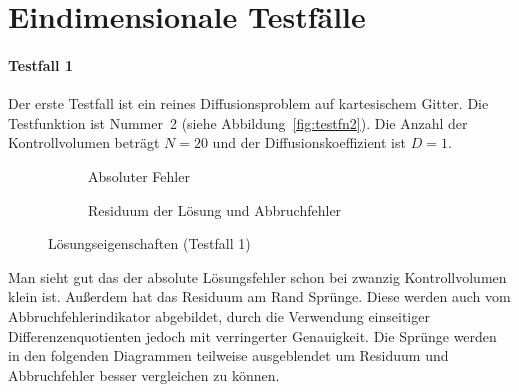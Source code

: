 \section{Eindimensionale Testfälle}

\paragraph{Testfall 1}
\noindent
Der erste Testfall ist ein reines Diffusionsproblem auf kartesischem
Gitter. Die Testfunktion ist Nummer~2 (siehe Abbildung~\ref{fig:testfn2}).
Die Anzahl der Kontrollvolumen beträgt $N=20$ und der Diffusionskoeffizient
ist $D = 1$.
\begin{figure}[ht]
\centering
   \begin{subfigure}{0.49\linewidth} \centering
     \caption{Absoluter Fehler}
   \end{subfigure}
   \begin{subfigure}{0.49\linewidth} \centering
     \vspace{15pt}
  \caption{Residuum der Lösung und Abbruchfehler}
   \end{subfigure}
   \caption{Lösungseigenschaften (Testfall 1)}
\end{figure}
Man sieht gut das der absolute Lösungsfehler schon bei zwanzig Kontrollvolumen klein ist.
Außerdem hat das Residuum am Rand Sprünge. Diese werden auch vom Abbruchfehlerindikator abgebildet,
durch die Verwendung einseitiger Differenzenquotienten jedoch mit verringerter Genauigkeit.
Die Sprünge werden in den folgenden Diagrammen teilweise ausgeblendet um
Residuum und Abbruchfehler besser vergleichen zu können.

